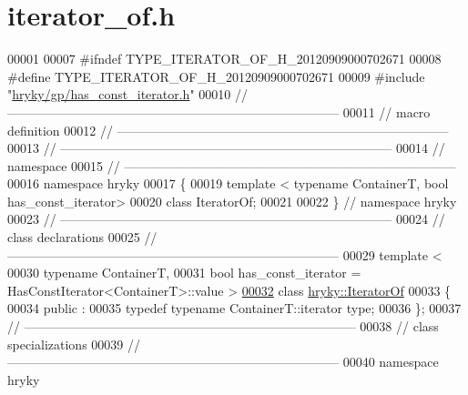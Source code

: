 \hypertarget{iterator__of_8h_source}{\section{iterator\-\_\-of.\-h}
}

\begin{DoxyCode}
00001 
00007 \textcolor{preprocessor}{#ifndef TYPE\_ITERATOR\_OF\_H\_20120909000702671}
00008 \textcolor{preprocessor}{}\textcolor{preprocessor}{#define TYPE\_ITERATOR\_OF\_H\_20120909000702671}
00009 \textcolor{preprocessor}{}\textcolor{preprocessor}{#include "\hyperlink{has__const__iterator_8h}{hryky/gp/has_const_iterator.h}"}
00010 \textcolor{comment}{//
      ------------------------------------------------------------------------------}
00011 \textcolor{comment}{// macro definition}
00012 \textcolor{comment}{//
      ------------------------------------------------------------------------------}
00013 \textcolor{comment}{//
      ------------------------------------------------------------------------------}
00014 \textcolor{comment}{// namespace}
00015 \textcolor{comment}{//
      ------------------------------------------------------------------------------}
00016 \textcolor{keyword}{namespace }hryky
00017 \{
00019     \textcolor{keyword}{template} < \textcolor{keyword}{typename} ContainerT, \textcolor{keywordtype}{bool} has\_const\_iterator>
00020     \textcolor{keyword}{class }IteratorOf;
00021 
00022 \} \textcolor{comment}{// namespace hryky}
00023 \textcolor{comment}{//
      ------------------------------------------------------------------------------}
00024 \textcolor{comment}{// class declarations}
00025 \textcolor{comment}{//
      ------------------------------------------------------------------------------}
00029 \textcolor{comment}{}\textcolor{keyword}{template} <
00030     \textcolor{keyword}{typename} ContainerT,
00031     \textcolor{keywordtype}{bool} has\_const\_iterator = HasConstIterator<ContainerT>::value >
\hypertarget{iterator__of_8h_source_l00032}{}\hyperlink{classhryky_1_1_iterator_of}{00032} \textcolor{keyword}{class }\hyperlink{classhryky_1_1_iterator_of}{hryky::IteratorOf}
00033 \{
00034 \textcolor{keyword}{public} :
00035     \textcolor{keyword}{typedef} \textcolor{keyword}{typename} ContainerT::iterator type;
00036 \};
00037 \textcolor{comment}{//
      ------------------------------------------------------------------------------}
00038 \textcolor{comment}{// class specializations}
00039 \textcolor{comment}{//
      ------------------------------------------------------------------------------}
00040 \textcolor{keyword}{namespace }hryky

\end{DoxyCode}
